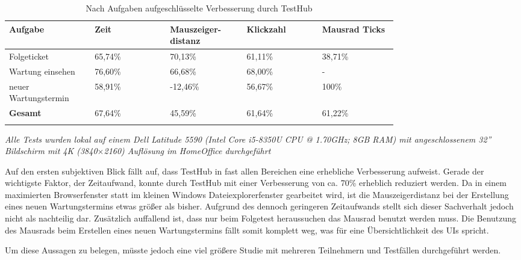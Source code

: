 \begin{longtable}{| P{0.15\linewidth} | P{0.15\linewidth} | P{0.15\linewidth} | P{0.15\linewidth} | P{0.15\linewidth} |} 
  \hline
  \textbf{Aufgabe} & \textbf{Zeit} & \textbf{Mauszeiger- distanz} & \textbf{Klickzahl} & \textbf{Mausrad Ticks}\\[0.5ex] 
  \hline
  
  Folgeticket & 65,74\% & 70,13\% & 61,11\% & 38,71\% \\ [0.5ex] \hline
  Wartung einsehen & 76,60\% & 66,68\% & 68,00\% & - \\ [0.5ex] \hline
  neuer Wartungstermin & 58,91\% & -12,46\% & 56,67\% & 100\% \\ [0.5ex] \hline
  \textbf{Gesamt} & 67,64\% & 45,59\% & 61,64\% & 61,22\% \\ [0.5ex] \hline
  \caption{Nach Aufgaben aufgeschlüsselte Verbesserung durch TestHub }\label{tab:valres}
\end{longtable}
\textit{Alle Tests wurden lokal auf einem Dell Latitude 5590 (Intel Core i5-8350U CPU
@ 1.70GHz; 8GB RAM) mit angeschlossenem 32'' Bildschirm mit 4K (3840$\times$2160) Auflösung im HomeOffice durchgeführt}

\newpage

Auf den ersten subjektiven Blick fällt auf, dass TestHub in fast allen Bereichen eine erhebliche
Verbesserung aufweist. Gerade der wichtigste Faktor, der Zeitaufwand, konnte durch TestHub 
mit einer Verbesserung von ca. 70\% erheblich reduziert werden. 
Da in einem maximierten Browserfenster statt im kleinen Windows 
Dateiexplorerfenster gearbeitet wird, ist die Mauszeigerdistanz bei der Erstellung eines neuen 
Wartungstermins etwas größer als bisher. Aufgrund des dennoch geringeren Zeitaufwands
stellt sich dieser Sachverhalt jedoch nicht als nachteilig dar.
Zusätzlich auffallend ist, dass nur beim Folgetest heraussuchen das Mausrad 
benutzt werden muss. Die Benutzung des 
Mausrads beim Erstellen eines neuen Wartungstermins fällt somit komplett weg, was für 
eine Übersichtlichkeit des \gls{UI}s spricht.

Um diese Aussagen zu belegen, müsste jedoch eine viel größere Studie mit mehreren 
Teilnehmern und Testfällen durchgeführt werden.

\newpage


